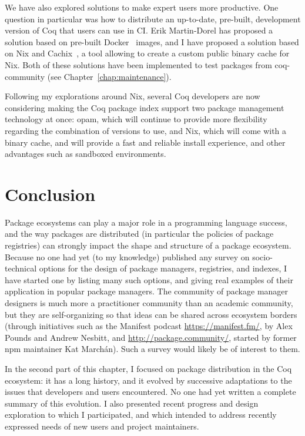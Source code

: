 We have also explored solutions to make expert users more productive.
One question in particular was how to distribute an up-to-date, pre-built, development version of Coq that users can use in CI.
Erik Martin-Dorel has proposed a solution based on pre-built Docker~\cite{hykes_docker} images, and I have proposed a solution based on Nix and Cachix~\cite{kozar_cachix}, a tool allowing to create a custom public binary cache for Nix.
Both of these solutions have been implemented to test packages from coq-community (see Chapter~\ref{chap:maintenance}).

Following my explorations around Nix, several Coq developers are now considering making the Coq package index support two package management technology at once: opam, which will continue to provide more flexibility regarding the combination of versions to use, and Nix, which will come with a binary cache, and will provide a fast and reliable install experience, and other advantages such as sandboxed environments.

\section{Conclusion}

Package ecosystems can play a major role in a programming language success, and the way packages are distributed (in particular the policies of package registries) can strongly impact the shape and structure of a package ecosystem.
Because no one had yet (to my knowledge) published any survey on socio-technical options for the design of package managers, registries, and indexes, I have started one by listing many such options, and giving real examples of their application in popular package managers.
The community of package manager designers is much more a practitioner community than an academic community, but they are self-organizing so that ideas can be shared across ecosystem borders (through initiatives such as the Manifest podcast \url{https://manifest.fm/}, by Alex Pounds and Andrew Nesbitt, and \url{http://package.community/}, started by former npm maintainer Kat March\'an).
Such a survey would likely be of interest to them.

In the second part of this chapter, I focused on package distribution in the Coq ecosystem: it has a long history, and it evolved by successive adaptations to the issues that developers and users encountered.
No one had yet written a complete summary of this evolution.
I also presented recent progress and design exploration to which I participated, and which intended to address recently expressed needs of new users and project maintainers.

